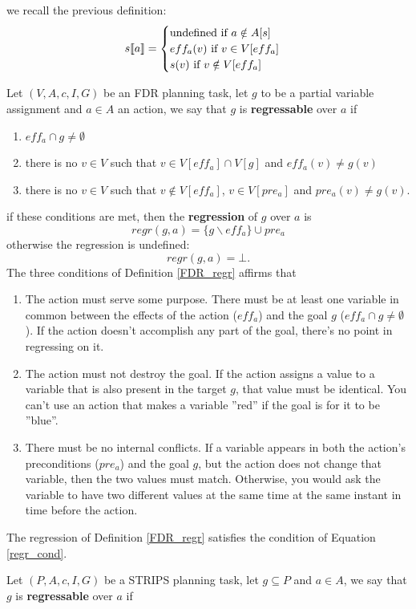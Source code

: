 \documentclass[10pt, letterpaper]{report}
\begin{document}
 we recall the previous definition:
 $$s\llbracket a \rrbracket=\begin{cases}
                \text{undefined} \text{ if }a\notin A[s]\\ 
                eff_a(v) \text{ if }v\in V[eff_a]\\ 
                s(v) \text{ if }v\notin  V[eff_a]
            \end{cases}$$
\begin{definition}\label{FDR_regr}
    Let $(V,A,c,I,G)$ be an FDR planning task, let $g$ to be a partial variable assignment and $a\in A$ an action, we say that $g$ is \textbf{regressable} over $a$ if 
\end{definition}\begin{enumerate}[label=(\roman*)]
    \item $eff_a\cap g\ne \emptyset$
    \item there is no $v\in V$ such that $v\in V[eff_a]\cap V[g]$ and $eff_a(v)\ne g(v)$
    \item there is no $v\in V$ such that $v\notin V[eff_a]$, $v\in V[pre_a]$ and $pre_a(v)\ne g(v)$.
\end{enumerate}
if these conditions are met, then the \textbf{regression} of $g$ over $a$ is\begin{equation}
    regr(g,a)=\{g\backslash eff_a\}\cup pre_a
\end{equation}
otherwise the regression is undefined:
\begin{equation}
    regr(g,a)=\bot.
\end{equation}
The three conditions of Definition \ref{FDR_regr} affirms that\begin{enumerate}[label=(\roman*)]
    \item The action must serve some purpose. There must be at least one variable in common between the effects of the action ($eff_a$) and the goal $g$ ($eff_a \cap g \neq \emptyset$). If the action doesn't accomplish any part of the goal, there's no point in regressing on it.
    \item The action must not destroy the goal. If the action assigns a value to a variable that is also present in the target $g$, that value must be identical. You can't use an action that makes a variable ''red'' if the goal is for it to be ''blue''.
    \item There must be no internal conflicts. If a variable appears in both the action's preconditions ($pre_a$) and the goal $g$, but the action does not change that variable, then the two values must match. Otherwise, you would ask the variable to have two different values at the same time at the same instant in time before the action.
\end{enumerate}
\begin{proposition}
    The regression of Definition \ref{FDR_regr} satisfies the condition of Equation \eqref{regr_cond}.
\end{proposition}
\begin{definition}\label{STRIPS_regression}
    Let $(P,A,c,I,G)$ be a STRIPS planning
 task, let $g\subseteq P$ and $a\in A$, we say that $g$ is \textbf{regressable} over $a$ if 
\end{definition}
\end{document}
